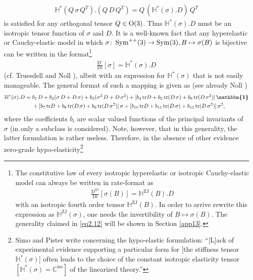 \documentclass[10pt]{article}
\numberwithin{theoremCounter}{section}
\theoremstyle{plain}
\theoremstyle{definition}
\newcommand{\id}{{\boldsymbol{\mathbbm{1}}}}
\newcommand{\OO}{{\rm O}}
\newcommand{\DD}{\mathrm{D}}
\DeclareMathOperator{\Sym}{Sym}
\DeclareMathOperator{\tr}{tr}
\DeclareMathOperator{\iso}{iso}
\DeclareMathOperator{\ZJ}{ZJ}
\def\tr{\textnormal{tr}}
\def\C{\mathbb{C}}
\def\H{\mathbb{H}}
\numberwithin{equation}{section}
\begin{document}
	\begin{align}
	\H^{*}(Q \, \sigma \, Q^T) . (Q \, D \, Q^T) = Q \, (\H^{*}(\sigma) . D) \, Q^T
	\end{align}
is satisfied for any orthogonal tensor $Q \in \OO(3)$. Thus $\H^{*}(\sigma) . D$ must be an isotropic tensor function of $\sigma$ and $D$. It is a well-known fact that any hyperelastic or Cauchy-elastic model in which $\sigma\colon \Sym^{++}(3) \to \Sym(3), \break B \mapsto \sigma(B)$ is bijective can be written in the format\footnote
{
The constitutive law of every isotropic hyperelastic or isotropic Cauchy-elastic model can always be written in rate-format as
	\begin{align}
	\frac{\DD^{\ZJ}}{\DD t}[\sigma(B)] = \H^{\ZJ}(B).D
	\end{align}
with an isotropic fourth order tensor $\H^{\ZJ}(B)$. In order to arrive rewrite this expression as $\H^{\ZJ}(\sigma)$, one needs the invertibility of $B \mapsto \sigma(B)$. The generality claimed in \eqref{eq2.12} will be shown in Section \ref{app13}.
}
	\begin{align}
	\label{eq2.12}
	\frac{\DD^{\circ}}{\DD t}[\sigma] = \H^*(\sigma).D
	\end{align}
(cf. Truesdell \cite{truesdellremarks} and Noll \cite{Noll55}), albeit with an expression for $\H^{*}(\sigma)$ that is not easily manageable. The general format of such a mapping is given as (see already Noll \cite{Noll55})
	\begin{equation}
	\label{eqrepresent001}
	\begin{alignedat}{2}
	\H^{*}(\sigma) . D = \; &b_1 \, D + b_2(\sigma \, D + D \, \sigma) + b_3(\sigma^2 \, D + D \, \sigma^2) + [b_4 \, \tr D + b_5 \, \tr(D \, \sigma) + b_6 \, \tr(D \, \sigma^2)] \, \id \\
	&+[b_7 \, \tr D + b_8 \, \tr(D \, \sigma) + b_9 \, \tr(D \, \sigma^2)] \, \sigma + [b_{10} \, \tr D + b_{11} \, \tr(D \, \sigma) + b_{12} \, \tr (D \, \sigma^2)] \, \sigma^2,
	\end{alignedat}
	\end{equation}
where the coefficients $b_i$ are scalar valued functions of the principal invariants of $\sigma$ (in \cite{bernstein2007} only a subclass is considered). Note, however, that in this generality, the latter formulation is rather useless. Therefore, in the absence of other evidence zero-grade hypo-elasticity\footnote
{
Simo and Pister \cite{simopister} write concerning the hypo-elastic formulation: \enquote{[L]ack of experimental evidence supporting a particular form for [the stiffness tensor $\H^{*}(\sigma)$] often leads to the choice of the constant isotropic elasticity tensor $[\H^{*}(\sigma) = \C^{\iso}]$ of the linearized theory.}
} \cite{kim2016}
\end{document}
